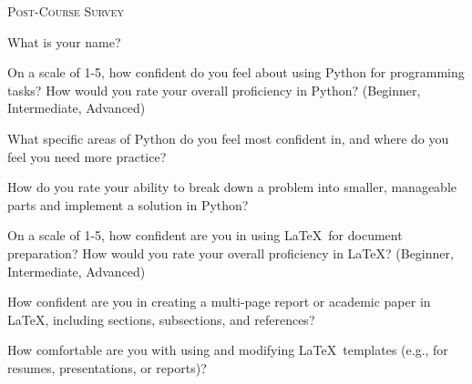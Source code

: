 \documentclass[11pt]{article}
\begin{document}
\begin{center}
\Large{\textsc{Post-Course Survey }}\\
\end{center}

\vspace{.2cm}

\begin{enumerate}[{$\qquad 1.]$}]

\item What is your name?\vfill


\item On a scale of 1-5, how confident do you feel about using Python for programming tasks? How would you rate your overall proficiency in Python? (Beginner, Intermediate, Advanced) \vfill

\item What specific areas of Python do you feel most confident in, and where do you feel you need more practice? \vfill


\item How do you rate your ability to break down a problem into smaller, manageable parts and implement a solution in Python?\vfill


\item On a scale of 1-5, how confident are you in using \LaTeX\, for document preparation?  How would you rate your overall proficiency in \LaTeX? (Beginner, Intermediate, Advanced) \vfill

\item How confident are you in creating a multi-page report or academic paper in \LaTeX, including sections, subsections, and references? \vfill

\item How comfortable are you with using and modifying \LaTeX\, templates (e.g., for resumes, presentations, or reports)? \vfill




\end{enumerate}
\end{document}
